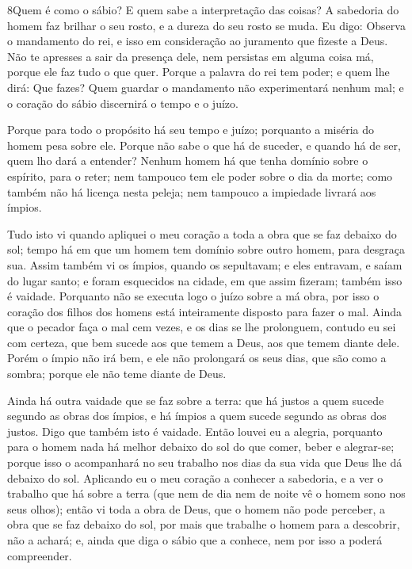 \medskip

\lettrine{8} Quem é como o sábio? E quem sabe a interpretação
das coisas? A sabedoria do homem faz brilhar o seu rosto, e a dureza
do seu rosto se muda. Eu digo: Observa o mandamento do rei, e
isso em consideração ao juramento que fizeste a Deus. Não te
apresses a sair da presença dele, nem persistas em alguma coisa má,
porque ele faz tudo o que quer. Porque a palavra do rei tem
poder; e quem lhe dirá: Que fazes? Quem guardar o mandamento não
experimentará nenhum mal; e o coração do sábio discernirá o tempo e
o juízo.

Porque para todo o propósito há seu tempo e juízo; porquanto a
miséria do homem pesa sobre ele. Porque não sabe o que há de
suceder, e quando há de ser, quem lho dará a entender? Nenhum
homem há que tenha domínio sobre o espírito, para o reter; nem
tampouco tem ele poder sobre o dia da morte; como também não há
licença nesta peleja; nem tampouco a impiedade livrará aos ímpios.

Tudo isto vi quando apliquei o meu coração a toda a obra que se
faz debaixo do sol; tempo há em que um homem tem domínio sobre outro
homem, para desgraça sua. Assim também vi os ímpios, quando
os sepultavam; e eles entravam, e saíam do lugar santo; e foram
esquecidos na cidade, em que assim fizeram; também isso é vaidade.
Porquanto não se executa logo o juízo sobre a má obra, por
isso o coração dos filhos dos homens está inteiramente disposto para
fazer o mal. Ainda que o pecador faça o mal cem vezes, e os
dias se lhe prolonguem, contudo eu sei com certeza, que bem sucede
aos que temem a Deus, aos que temem diante dele. Porém o
ímpio não irá bem, e ele não prolongará os seus dias, que são como a
sombra; porque ele não teme diante de Deus.

Ainda há outra vaidade que se faz sobre a terra: que há justos a
quem sucede segundo as obras dos ímpios, e há ímpios a quem sucede
segundo as obras dos justos. Digo que também isto é vaidade.
Então louvei eu a alegria, porquanto para o homem nada há
melhor debaixo do sol do que comer, beber e alegrar-se; porque isso
o acompanhará no seu trabalho nos dias da sua vida que Deus lhe dá
debaixo do sol. Aplicando eu o meu coração a conhecer a
sabedoria, e a ver o trabalho que há sobre a terra (que nem de dia
nem de noite vê o homem sono nos seus olhos); então vi toda a
obra de Deus, que o homem não pode perceber, a obra que se faz
debaixo do sol, por mais que trabalhe o homem para a descobrir, não
a achará; e, ainda que diga o sábio que a conhece, nem por isso a
poderá compreender.

